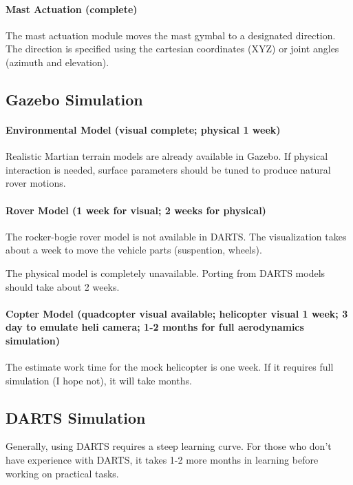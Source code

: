 \documentclass[conference]{IEEEtran}
\begin{document}
\paragraph{Mast Actuation (complete)}
The mast actuation module moves the mast gymbal to a designated direction. The direction is specified using the cartesian coordinates (XYZ) or joint angles (azimuth and elevation). 



\subsection{Gazebo Simulation}

\paragraph{Environmental Model (visual complete; physical 1 week)}
Realistic Martian terrain models are already available in Gazebo. If physical interaction is needed, surface parameters should be tuned to produce natural rover motions. 

\paragraph{Rover Model (1 week for visual; 2 weeks for physical)}
The rocker-bogie rover model is not available in DARTS. The visualization takes about a week to move the vehicle parts (suspention, wheels). 

The physical model is completely unavailable. Porting from DARTS models should take about 2 weeks.

\paragraph{Copter Model (quadcopter visual available; helicopter visual 1 week; 3 day to emulate heli camera; 1-2 months for full aerodynamics simulation)}
The estimate work time for the mock helicopter is one week. If it requires full simulation (I hope not), it will take months. 


\subsection{DARTS Simulation}

Generally, using DARTS requires a steep learning curve. For those who don't have experience with DARTS, it takes 1-2 more months in learning before working on practical tasks. 
\end{document}
